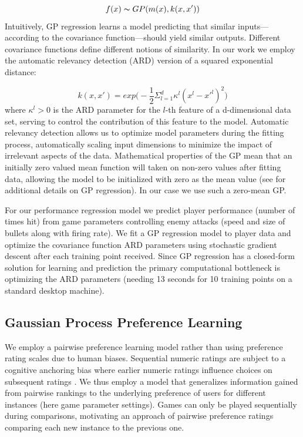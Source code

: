 \documentclass[letterpaper]{article}
\begin{document}
$$ f(x) \thicksim GP( m(x), k(x,x') ) $$
Intuitively, GP regression learns a model predicting that similar inputs---according to the covariance function---should yield similar outputs. Different covariance functions define different notions of similarity. In our work we employ the automatic relevancy detection (ARD) version of a squared exponential distance:

$$ k(x,x') = exp\big( -\frac{1}{2} \Sigma_{l=1}^{d} \kappa^{l} (x^{l} - x'^{l})^2 \big) $$
where $\kappa^{l} > 0$ is the ARD parameter for the $l$-th feature of a {d}-dimensional data set, serving to control the contribution of this feature to the model. Automatic relevancy detection allows us to optimize model parameters during the fitting process, automatically scaling input dimensions to minimize the impact of irrelevant aspects of the data. Mathematical properties of the GP mean that an initially zero valued mean function will taken on non-zero values after fitting data, allowing the model to be initialized with zero as the mean value (see \cite{rasmussen2006} for additional details on GP regression). In our case we use such a zero-mean GP.

For our performance regression model we predict player performance (number of times hit) from game parameters controlling enemy attacks (speed and size of bullets along with firing rate). We fit a GP regression model to player data and optimize the covariance function ARD parameters using stochastic gradient descent after each training point received. Since GP regression has a closed-form solution for learning and prediction the primary computational bottleneck is optimizing the ARD parameters (needing 13 seconds for 10 training points on a standard desktop machine).

\subsection{Gaussian Process Preference Learning}
We employ a pairwise preference learning model rather than using preference rating scales due to human biases. Sequential numeric ratings are subject to a cognitive anchoring bias where earlier numeric ratings influence choices on subsequent ratings \cite{tversky1974:biases}. We thus employ a model that generalizes information gained from pairwise rankings to the underlying preference of users for different instances (here game parameter settings). Games can only be played sequentially during comparisons, motivating an approach of pairwise preference ratings comparing each new instance to the previous one.
\end{document}
